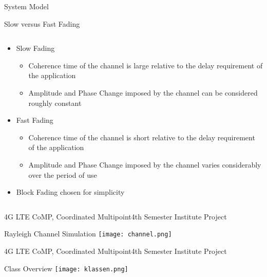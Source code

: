 \documentclass[xcolor={cmyk}]{beamer}
\begin{document}
  \begin{frame}{System Model}
	 \begin{block}{Slow versus Fast Fading}
	 	\begin{columns}
			\begin{column}{.9\textwidth}
				\begin{itemize}
					\item Slow Fading
					\begin{itemize}
						\item Coherence time of the channel is large relative to the delay requirement of the application
						\item Amplitude and Phase Change imposed by the channel can be considered roughly constant
					\end{itemize}
					\item Fast Fading
					\begin{itemize}
						\item Coherence time of the channel is short relative to the delay requirement of the application
						\item Amplitude and Phase Change imposed by the channel varies considerably over the period of use
					\end{itemize}
					
					
					\item Block Fading chosen for simplicity
				\end{itemize}
			\end{column}
		\end{columns}
	 \end{block}
 \end{frame}
 
  \begin{frame}{4G LTE CoMP, Coordinated Multipoint}{4th Semester Institute Project}
	 \begin{block}{Rayleigh Channel Simulation}
		 \texttt{[image: channel.png]}
	 \end{block}
 \end{frame}
 
  \begin{frame}{4G LTE CoMP, Coordinated Multipoint}{4th Semester Institute Project}
	 \begin{block}{Class Overview}
		 \texttt{[image: klassen.png]}
	 \end{block}
 \end{frame}
\end{document}
